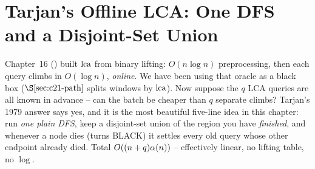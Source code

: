 \section{Tarjan's Offline LCA: One DFS and a Disjoint-Set Union}\label{sec:c21-tarjan}

\begin{previouslybox}
Chapter~16 () built \(\operatorname{lca}\) from binary lifting: \(O(n\log n)\)
preprocessing, then each query climbs in \(O(\log n)\), \emph{online}.  We have
been using that oracle as a black box (\(\secref{c21-path}\) splits windows by
\(\operatorname{lca}\)).  Now suppose the \(q\) LCA queries are all known in advance -- can the
batch be cheaper than \(q\) separate climbs?  Tarjan's 1979 answer says yes, and
it is the most beautiful five-line idea in this chapter: run \emph{one plain
DFS}, keep a disjoint-set union of the region you have \emph{finished}, and
whenever a node dies (turns BLACK) it settles every old query whose other
endpoint already died.  Total \(O((n+q)\alpha(n))\) -- effectively linear,
no lifting table, no \(\log\).
\end{previouslybox}

